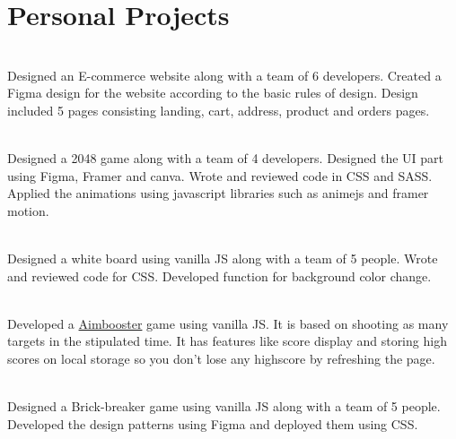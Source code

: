 \begin{minipage}[t]{0.66\textwidth}

\section{Personal Projects}

 \\
Designed an E-commerce website along with a team of 6 developers. Created a Figma design for the website according to the basic rules of design. Design included 5 pages consisting landing, cart, address, product and orders pages.
\sectionsep

 \\
Designed a 2048 game along with a team of 4 developers. Designed the UI part using Figma, Framer and canva. Wrote and reviewed code in CSS and SASS. Applied the animations using javascript libraries such as animejs and framer motion.
\sectionsep

  \\
Designed a white board using vanilla JS along with a team of 5 people. Wrote and reviewed code for CSS. Developed function for background color change. 
\sectionsep

 \\
Developed a \href{http://www.aimbooster.com/}{Aimbooster} game using vanilla JS. It is based on shooting as many targets in the stipulated time. It has features like score display and storing high scores on local storage so you don't lose any highscore by refreshing the page.   
\sectionsep

 \\
Designed a Brick-breaker game using vanilla JS along with a team of 5 people. Developed the design patterns using Figma and deployed them using CSS. 
\sectionsep


\end{minipage} 
  \documentclass[]{article}
